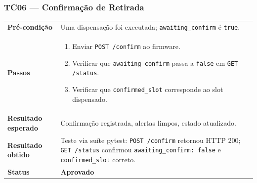\documentclass[12pt,a4paper]{article}
\newcommand{\lightrule}{\arrayrulecolor{gray!35}\midrule\arrayrulecolor{black}}
\newcommand{\aprovado}{\textcolor{green!60!black}{\textbf{Aprovado}}}
\begin{document}
\subsubsection{TC06 — Confirmação de Retirada}
\begin{table}[H]\small\setlength{\tabcolsep}{6pt}\renewcommand{\arraystretch}{1.3}
\begin{tabularx}{\textwidth}{>{\bfseries}p{4cm} X}
\toprule
Pré-condição & Uma dispensação foi executada; \texttt{awaiting\_confirm} é \texttt{true}. \\
\lightrule
Passos &
\begin{enumerate}[nosep,leftmargin=*]
  \item Enviar \texttt{POST /confirm} ao firmware.
  \item Verificar que \texttt{awaiting\_confirm} passa a \texttt{false} em \texttt{GET /status}.
  \item Verificar que \texttt{confirmed\_slot} corresponde ao slot dispensado.
\end{enumerate} \\
\lightrule
Resultado esperado & Confirmação registrada, alertas limpos, estado atualizado. \\
\lightrule
Resultado obtido & Teste via suíte pytest: \texttt{POST /confirm} retornou HTTP 200; \texttt{GET /status} confirmou \texttt{awaiting\_confirm: false} e \texttt{confirmed\_slot} correto. \\
\lightrule
Status & \aprovado \\
\bottomrule
\end{tabularx}\end{table}
\end{document}
